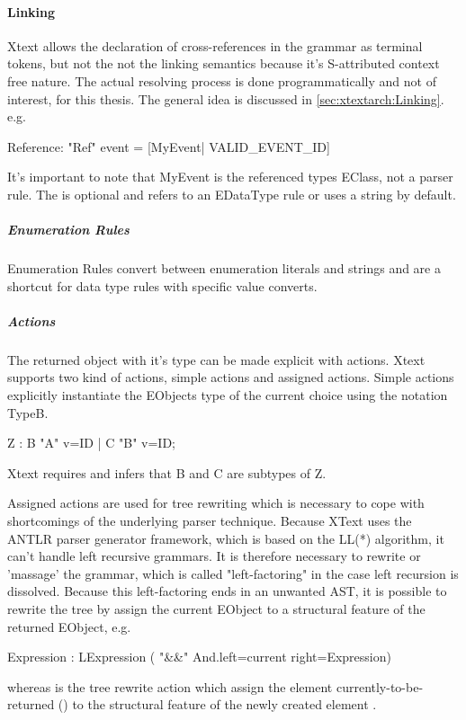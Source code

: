 \paragraph{Linking}
Xtext allows the declaration of cross-references in the grammar as terminal tokens, but not the not the linking semantics because it's S-attributed context free nature. The actual resolving process is done programmatically and not of interest, for this thesis. The general idea is discussed in \ref{sec:xtextarch:Linking}.
e.g. 
\begin{xtxt}
Reference:  "Ref" event = [MyEvent| VALID_EVENT_ID]
\end{xtxt}
It's important to note that MyEvent is the referenced types EClass, not a parser rule. The   is optional and refers to an EDataType rule or uses a string by default.

\subparagraph{Enumeration Rules}
Enumeration Rules convert between enumeration literals and strings and are a shortcut for data type rules with specific value converts.

\subparagraph{Actions}
The returned object with it's type can be made explicit with actions. Xtext supports two kind of actions, simple actions and assigned actions. Simple actions explicitly instantiate the EObjects type of the current choice using the notation {TypeB}.
\begin{xtxt}
Z 	: 	{B} "A" v=ID
	| 	{C} "B" v=ID;
\end{xtxt}
Xtext requires and infers that B and C are subtypes of Z. 

Assigned actions are used for tree rewriting which is necessary to cope with shortcomings of the underlying parser technique. Because XText uses the ANTLR parser generator framework, which is based on the LL(*) algorithm, it can't handle left recursive grammars. It is therefore necessary to rewrite or 'massage' the grammar, which is called "left-factoring" in the case left recursion is dissolved. Because this left-factoring ends in an unwanted AST, it is possible to rewrite the tree by assign the current EObject to a structural feature of the returned EObject, e.g. 
\begin{xtxt}
Expression 	: 	LExpression 
	 	( "&&" {And.left=current}  right=Expression)
\end{xtxt}
whereas  is the tree rewrite action which assign the element currently-to-be-returned () to the structural feature  of the newly created element .


